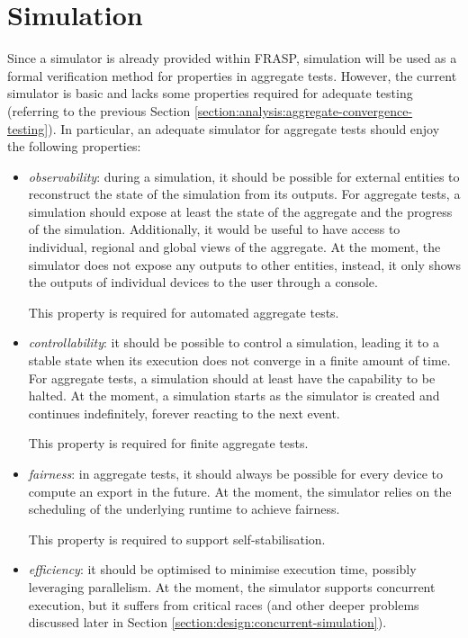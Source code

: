
\section{Simulation}
\label{section:analysis:simulation}

Since a simulator is already provided within FRASP, simulation will be used as
a formal verification method for properties in aggregate tests. However, the
current simulator is basic and lacks some properties required for adequate
testing (referring to the previous Section
\ref{section:analysis:aggregate-convergence-testing}). In particular, an
adequate simulator for aggregate tests should enjoy the following properties:
\begin{itemize}
  \item \textit{observability}: during a simulation, it should be possible for
        external entities to reconstruct the state of the simulation from its
        outputs. For aggregate tests, a simulation should expose at least the
        state of the aggregate and the progress of the simulation. Additionally,
        it would be useful to have access to individual, regional and global
        views of the aggregate. At the moment, the simulator does not expose
        any outputs to other entities, instead, it only shows the outputs of
        individual devices to the user through a console.

        This property is required for automated aggregate tests.
  \item \textit{controllability}: it should be possible to control a
        simulation, leading it to a stable state when its execution does not
        converge in a finite amount of time. For aggregate tests, a simulation
        should at least have the capability to be halted. At the moment, a
        simulation starts as the simulator is created and continues
        indefinitely, forever reacting to the next event.

        This property is required for finite aggregate tests.
  \item \textit{fairness}: in aggregate tests, it should always be possible for
        every device to compute an export in the future. At the moment, the
        simulator relies on the scheduling of the underlying runtime to achieve
        fairness.

        This property is required to support self-stabilisation.
  \item \textit{efficiency}: it should be optimised to minimise execution time,
        possibly leveraging parallelism. At the moment, the simulator supports
        concurrent execution, but it suffers from critical races (and other
        deeper problems discussed later in Section
        \ref{section:design:concurrent-simulation}).


\end{itemize}
